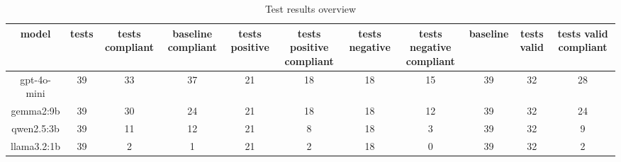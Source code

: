 
  \begin{table}[h!]
  \centering
  \begin{tabular}{|c|c|c|c|c|c|c|c|c|c|c|}
  \hline
  model & tests & tests compliant & baseline compliant & tests positive & tests positive compliant & tests negative & tests negative compliant & baseline & tests valid & tests valid compliant \\
  \hline
  gpt-4o-mini & 39 & 33 & 37 & 21 & 18 & 18 & 15 & 39 & 32 & 28\\
\hline
gemma2:9b & 39 & 30 & 24 & 21 & 18 & 18 & 12 & 39 & 32 & 24\\
\hline
qwen2.5:3b & 39 & 11 & 12 & 21 & 8 & 18 & 3 & 39 & 32 & 9\\
\hline
llama3.2:1b & 39 & 2 & 1 & 21 & 2 & 18 & 0 & 39 & 32 & 2
  \end{tabular}
  \caption{Test results overview}
  
  \end{table}
  